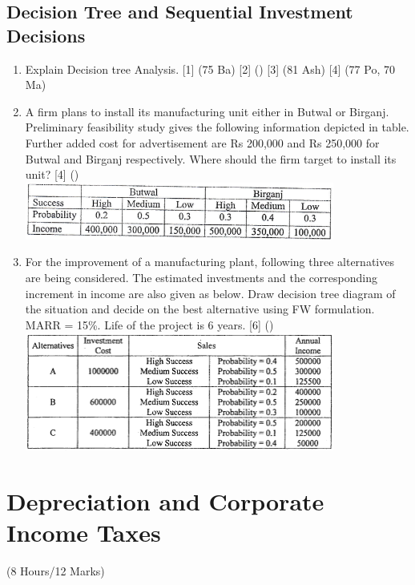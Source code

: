 \documentclass[12pt]{article}
\begin{document}
	\subsection{Decision Tree and Sequential Investment Decisions}
		\begin{enumerate}
			\item Explain Decision tree Analysis. \hfill [1] (75 Ba) [2] () [3] (81 Ash) [4] (77 Po, 70 Ma)
			
			\item A firm plans to install its manufacturing unit either in Butwal or Birganj. Preliminary feasibility study gives the following information depicted in table. Further added cost for advertisement are Rs 200,000 and Rs 250,000 for Butwal and Birganj respectively. Where should the firm target to install its unit? \hfill [4] ()\\
			\includegraphics[width=4in]{./pics/ee_3}

			\item For the improvement of a manufacturing plant, following three alternatives are being considered. The estimated investments and the corresponding increment in income are also given as below. Draw decision tree diagram of the situation and decide on the best alternative using FW formulation. MARR = 15\%. Life of the project is 6 years. \hfill [6] ()
			\includegraphics[width=4in]{./pics/ee_4}
		\end{enumerate}

	\pagebreak

\section{Depreciation and Corporate Income Taxes}	
	\begin{center}(8 Hours/12 Marks)\end{center}
\end{document}
